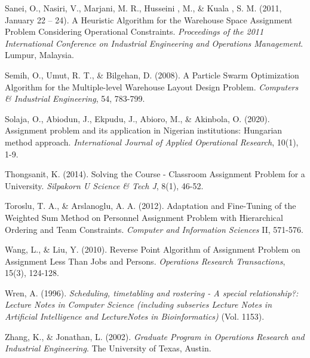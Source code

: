 \documentclass[11pt]{report}
\begin{document}
\begin{description}
		\item Sanei, O., Nasiri, V., Marjani, M. R., Husseini , M., \& Kuala , S. M. (2011, January 22 – 24). A
		Heuristic Algorithm for the Warehouse Space Assignment Problem Considering
		Operational Constraints. \emph{Proceedings of the 2011 International Conference on Industrial
		Engineering and Operations Management}. Lumpur, Malaysia.
		
		\item Semih, O., Umut, R. T., \& Bilgehan, D. (2008). A Particle Swarm Optimization Algorithm for the
		Multiple-level Warehouse Layout Design Problem. \emph{Computers \& Industrial Engineering},
		54, 783-799.
		
		\item Solaja, O., Abiodun, J., Ekpudu, J., Abioro, M., \& Akinbola, O. (2020). Assignment problem and
		its application in Nigerian institutions: Hungarian method approach. \emph{International Journal
		of Applied Operational Research}, 10(1), 1-9.
		
		\item Thongsanit, K. (2014). Solving the Course - Classroom Assignment Problem for a University.
		\emph{Silpakorn U Science \& Tech J}, 8(1), 46-52.
		
		\item Toroslu, T. A., \& Arslanoglu, A. A. (2012). Adaptation and Fine-Tuning of the Weighted Sum
		Method on Personnel Assignment Problem with Hierarchical Ordering and Team Constraints. \emph{Computer and Information Sciences} II, 571-576.
		
		\item Wang, L., \& Liu, Y. (2010). Reverse Point Algorithm of Assignment Problem on Assignment Less Than Jobs and Persons. \emph{Operations Research Transactions}, 15(3), 124-128.
		
		\item Wren, A. (1996). \emph{Scheduling, timetabling and rostering - A special relationship?: Lecture Notes
		in Computer Science (including subseries Lecture Notes in Artificial Intelligence and
		LectureNotes in Bioinformatics)} (Vol. 1153).
		
		\item Zhang, K., \& Jonathan, L. (2002). \emph{Graduate Program in Operations Research and Industrial Engineering}. The University of Texas, Austin.
	\end{description}
	
\end{document}
